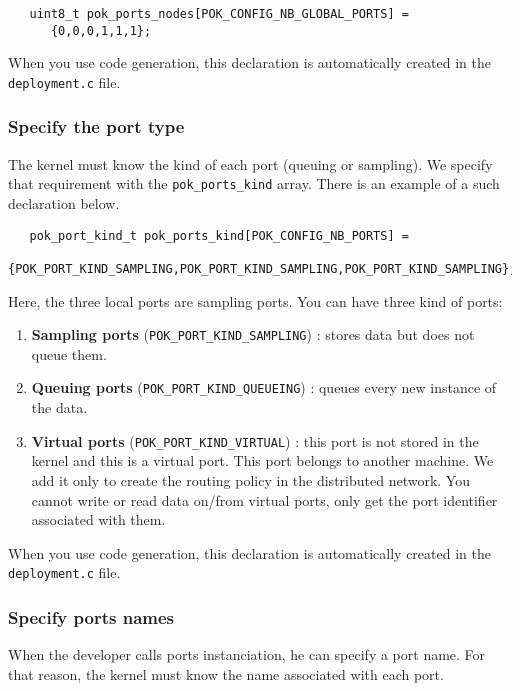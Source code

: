    \begin{verbatim}
   uint8_t pok_ports_nodes[POK_CONFIG_NB_GLOBAL_PORTS] =
      {0,0,0,1,1,1};
   \end{verbatim}

   When you use code generation, this declaration is
   automatically created in the \texttt{deployment.c} file.


   \subsubsection{Specify the port type}
   The kernel must know the kind of each port (queuing or sampling). We specify
   that requirement with the \texttt{pok\_ports\_kind} array. There is an
   example of a such declaration below.

   \begin{verbatim}
   pok_port_kind_t pok_ports_kind[POK_CONFIG_NB_PORTS] =
   {POK_PORT_KIND_SAMPLING,POK_PORT_KIND_SAMPLING,POK_PORT_KIND_SAMPLING};
   \end{verbatim}

   Here, the three local ports are sampling ports. You can have three kind of
   ports:
   \begin{enumerate}
      \item
         \textbf{Sampling ports} (\texttt{POK\_PORT\_KIND\_SAMPLING}) : stores data but does not queue them.
      \item
         \textbf{Queuing ports} (\texttt{POK\_PORT\_KIND\_QUEUEING}) : queues every new instance of the data.
      \item 
         \textbf{Virtual ports} (\texttt{POK\_PORT\_KIND\_VIRTUAL}) : this port is not stored in the kernel and this
         is a virtual port. This port belongs to another machine. We add it only
         to create the routing policy in the distributed network. You cannot
         write or read data on/from virtual ports, only get the port identifier
         associated with them.
   \end{enumerate}

   When you use code generation, this declaration is
   automatically created in the \texttt{deployment.c} file.


   \subsubsection{Specify ports names}
   When the developer calls ports instanciation, he can specify a port name. For
   that reason, the kernel must know the name associated with each port.

